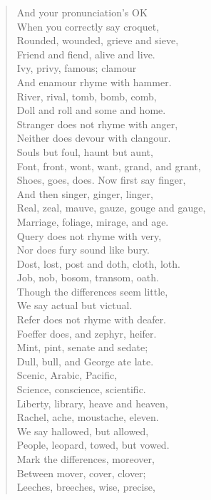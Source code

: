 \documentclass[11pt, oneside]{article}   	%
\begin{document}
\begin{verse}
And your pronunciation's OK \\
When you correctly say croquet, \\
Rounded, wounded, grieve and sieve, \\
Friend and fiend, alive and live.\\
Ivy, privy, famous; clamour \\
And enamour rhyme with hammer. \\
River, rival, tomb, bomb, comb, \\
Doll and roll and some and home. \\
Stranger does not rhyme with anger, \\
Neither does devour with clangour. \\
Souls but foul, haunt but aunt, \\
Font, front, wont, want, grand, and grant, \\
Shoes, goes, does. Now first say finger, \\
And then singer, ginger, linger, \\
Real, zeal, mauve, gauze, gouge and gauge, \\
Marriage, foliage, mirage, and age.\\
Query does not rhyme with very, \\
Nor does fury sound like bury. \\
Dost, lost, post and doth, cloth, loth. \\
Job, nob, bosom, transom, oath. \\
Though the differences seem little, \\
We say actual but victual. \\
Refer does not rhyme with deafer. \\
Foeffer does, and zephyr, heifer. \\
Mint, pint, senate and sedate; \\ 
Dull, bull, and George ate late. \\
Scenic, Arabic, Pacific, \\
Science, conscience, scientific.\\
Liberty, library, heave and heaven, \\
Rachel, ache, moustache, eleven. \\
We say hallowed, but allowed, \\
People, leopard, towed, but vowed. \\
Mark the differences, moreover, \\
Between mover, cover, clover; \\
Leeches, breeches, wise, precise, \\

\end{verse}
\end{document}
